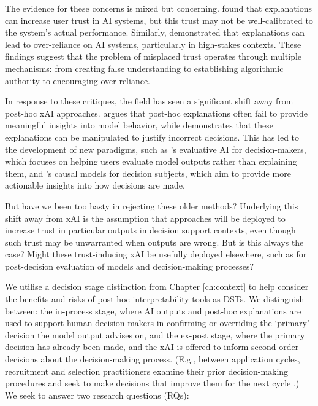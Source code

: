 The evidence for these concerns is mixed but concerning. \textcite{lai_human_2019} found that explanations can increase user trust in AI systems, but this trust may not be well-calibrated to the system's actual performance. Similarly, \textcite{jacobs_how_2021} demonstrated that explanations can lead to over-reliance on AI systems, particularly in high-stakes contexts. These findings suggest that the problem of misplaced trust operates through multiple mechanisms: from creating false understanding to establishing algorithmic authority to encouraging over-reliance.

In response to these critiques, the field has seen a significant shift away from post-hoc xAI approaches. \textcite{kumar_problems_2020} argues that post-hoc explanations often fail to provide meaningful insights into model behavior, while \textcite{Bastounis_Campodonico_vanderSchaar_Adcock_Hansen_2024} demonstrates that these explanations can be manipulated to justify incorrect decisions. This has led to the development of new paradigms, such as \textcite{miller_explainable_2023}'s evaluative AI for decision-makers, which focuses on helping users evaluate model outputs rather than explaining them, and \textcite{karimi_algorithmic_2021}'s causal models for decision subjects, which aim to provide more actionable insights into how decisions are made.

But have we been too hasty in rejecting these older methods? Underlying this shift away from xAI is the assumption that approaches will be deployed to increase trust in particular outputs in decision support contexts, even though such trust may be unwarranted when outputs are wrong. But is this always the case? Might these trust-inducing xAI be usefully deployed elsewhere, such as for post-decision evaluation of models and decision-making processes?

We utilise a decision stage distinction from Chapter \ref{ch:context} to help consider the benefits and risks of post-hoc interpretability tools as DSTs. We distinguish between: the in-process stage, where AI outputs and post-hoc explanations are used to support human decision-makers in confirming or overriding the `primary' decision the model output advises on, and the ex-post stage, where the primary decision has already been made, and the xAI is offered to inform second-order decisions about the decision-making process. (E.g., between application cycles, recruitment and selection practitioners examine their prior decision-making procedures and seek to make decisions that improve them for the next cycle \cite{li2020hiring}.) We seek to answer two research questions (RQs):


